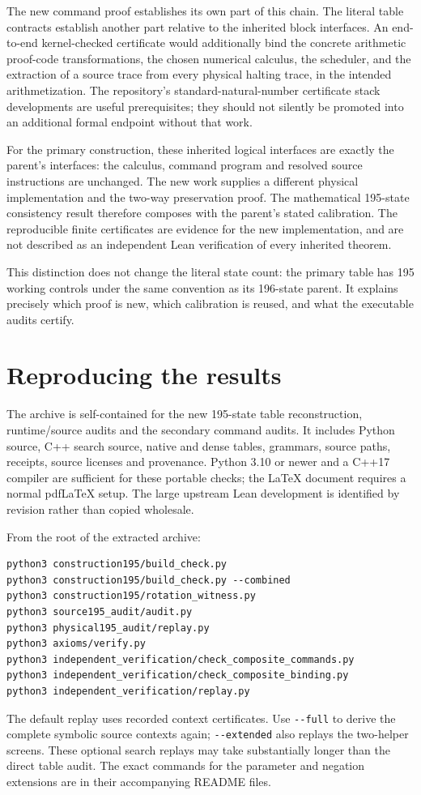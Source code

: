 \documentclass[11pt,a4paper]{article}
\newcommand{\file}[1]{\texttt{\nolinkurl{#1}}}
\begin{document}
The new command proof establishes its own part of this chain. The
literal table contracts establish another part relative to the
inherited block interfaces. An end-to-end kernel-checked certificate would additionally bind the concrete arithmetic proof-code transformations, the
chosen numerical calculus, the scheduler, and the extraction of a
source trace from every physical halting trace, in the intended
arithmetization. The repository's standard-natural-number certificate
stack developments are useful prerequisites; they should not silently
be promoted into an additional formal endpoint without that work.

For the primary construction, these inherited logical interfaces are
exactly the parent's interfaces: the calculus, command program and
resolved source instructions are unchanged. The new work supplies a
different physical implementation and the two-way preservation proof.
The mathematical 195-state consistency result therefore composes with
the parent's stated calibration. The reproducible finite certificates
are evidence for the new implementation, and are not described as an
independent Lean verification of every inherited theorem.

This distinction does not change the literal state count: the primary
table has 195 working controls under the same convention as its
196-state parent. It explains precisely which proof is new, which
calibration is reused, and what the executable audits certify.

\section{Reproducing the results}

The archive is self-contained for the new 195-state table reconstruction,
runtime/source audits and the secondary command audits.
It includes Python source, C++ search source, native and dense tables,
grammars, source paths, receipts, source licenses and provenance.
Python 3.10 or newer and a C++17 compiler are sufficient for these
portable checks; the LaTeX document requires a normal pdfLaTeX setup.
The large upstream Lean development is identified by revision rather
than copied wholesale.

From the root of the extracted archive:
\begin{verbatim}
python3 construction195/build_check.py
python3 construction195/build_check.py --combined
python3 construction195/rotation_witness.py
python3 source195_audit/audit.py
python3 physical195_audit/replay.py
python3 axioms/verify.py
python3 independent_verification/check_composite_commands.py
python3 independent_verification/check_composite_binding.py
python3 independent_verification/replay.py
\end{verbatim}
The default replay uses recorded context certificates. Use
\file{--full} to derive the complete symbolic source contexts again;
\file{--extended} also replays the two-helper screens. These optional
search replays may take substantially longer than the direct table
audit. The exact commands for the parameter and negation extensions
are in their accompanying README files.
\end{document}
